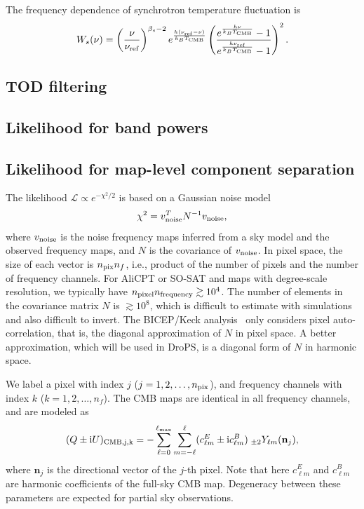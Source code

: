 \documentclass[12pt, a4paper]{ctexart} %
\begin{document}
The frequency dependence of synchrotron temperature fluctuation is
\begin{equation}
  W_s(\nu) = \left(\frac{\nu}{\nu_{\rm ref}}\right)^{\beta_s-2}e^{\frac{h(\nu_{\rm ref} - \nu)}{k_BT_{\rm CMB}}}\left(\frac{e^{\frac{h\nu}{k_BT_{\rm CMB}}}-1}{e^{\frac{h\nu_{\rm ref}}{k_BT_{\rm CMB}}}-1}\right)^2. \label{eq:sync_w}
\end{equation}

\subsection{TOD filtering}


\subsection{Likelihood for band powers}


\subsection{Likelihood for map-level component separation}

The likelihood $\mathcal{L}\propto e^{-\chi^2/2}$ is based on a Gaussian noise model
\begin{equation}
  \chi^2 = v_{\rm noise}^TN^{-1}v_{\rm noise},
\end{equation}
where $v_{\rm noise}$ is the noise frequency maps inferred from a sky model and the observed frequency maps, and $N$ is the covariance of $v_{\rm noise}$. In pixel space, the size of each vector is $n_{\rm pix} n_f$, i.e., product of the number of pixels and the number of frequency channels. For AliCPT or SO-SAT and maps with degree-scale resolution, we typically have $n_{\rm pixel} n_{\rm frequency} \gtrsim 10^4$. The number of elements in the covariance matrix $N$ is $\gtrsim 10^8$, which is difficult to estimate with simulations and also difficult to invert. The BICEP/Keck analysis~\cite{BKmap} only considers pixel auto-correlation, that is, the diagonal approximation of $N$ in pixel space. A better approximation, which will be used in DroPS, is a diagonal form of $N$ in harmonic space.

We label a pixel with index $j$ ($j=1, 2, \ldots, n_{\rm pix}$), and frequency channels with index $k$ ($k = 1, 2, \ldots, n_f$). The CMB maps are identical in all frequency channels, and are modeled as
\begin{equation}
  (Q\pm \mathrm{i}U)_{\rm CMB, j, k} = -\sum_{\ell = 0}^{\ell_{\max}}\sum_{m=-\ell}^\ell (c_{\ell m}^E\pm \mathrm{i} c_{\ell m}^B)\;_{\pm 2}Y_{\ell m}(\mathbf{n}_j), \label{eq:CMB_comp}
\end{equation}
where $\mathbf{n}_j$ is the directional vector of the $j$-th pixel. Note that here $c_{\ell m}^E$ and $c_{\ell m}^B$ are harmonic coefficients of the full-sky CMB map. Degeneracy between these parameters are expected for partial sky observations. 
\end{document}
